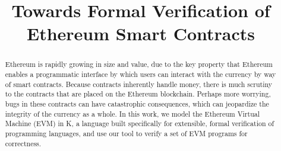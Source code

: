 \documentclass{llncs}
\begin{document}
\thispagestyle{empty}

\title{Towards Formal Verification of Ethereum  Smart Contracts}




\maketitle
\begin{abstract}
Ethereum is rapidly growing in size and value, due to the key property that
Ethereum enables a programmatic interface by which users can interact with the
currency by way of smart contracts. Because contracts inherently handle money, there
is much scrutiny to the contracts that are placed on the Ethereum blockchain.
Perhaps more worrying, bugs in these contracts can have catastrophic
consequences, which can jeopardize the integrity of the currency as a whole.
In this work, we model the Ethereum Virtual Machine (EVM) in K, a language built
specifically for extensible, formal verification of programming languages, and
use our tool to verify a set of EVM programs for correctness.
\end{abstract}
% 










\small

\nocite{*}
\end{document}
